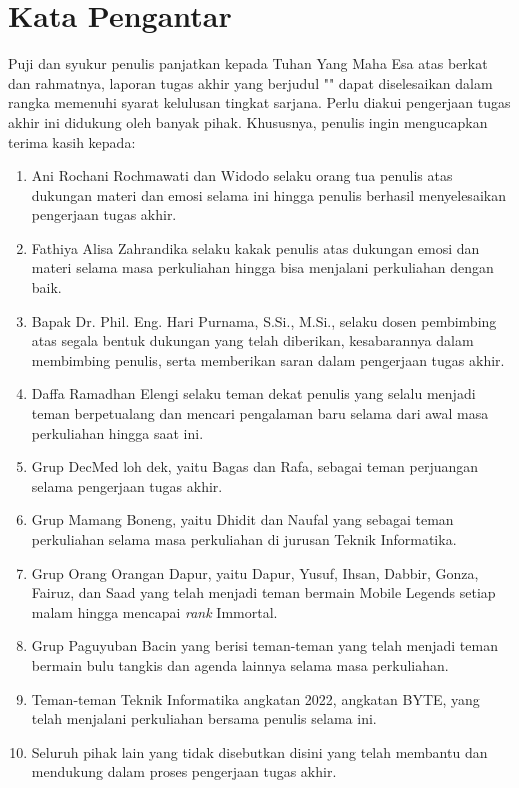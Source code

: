 \documentclass[bahasa, 12pt, a4paper, onecolumn, oneside, final]{report}
\begin{document}
\chapter*{Kata Pengantar}

Puji dan syukur penulis panjatkan kepada Tuhan Yang Maha Esa atas berkat dan rahmatnya, laporan tugas akhir yang berjudul "\thetitle" dapat diselesaikan dalam rangka memenuhi syarat kelulusan tingkat sarjana. Perlu diakui pengerjaan tugas akhir ini didukung oleh banyak pihak. Khususnya, penulis ingin mengucapkan terima kasih kepada:

\begin{enumerate}
	\item Ani Rochani Rochmawati dan Widodo selaku orang tua penulis atas dukungan materi dan emosi selama ini hingga penulis berhasil menyelesaikan pengerjaan tugas akhir.
	\item Fathiya Alisa Zahrandika selaku kakak penulis atas dukungan emosi dan materi selama masa perkuliahan hingga bisa menjalani perkuliahan dengan baik.
	\item Bapak Dr. Phil. Eng. Hari Purnama, S.Si., M.Si., selaku dosen pembimbing atas segala bentuk dukungan yang telah diberikan, kesabarannya dalam membimbing penulis, serta memberikan saran dalam pengerjaan tugas akhir.
	\item Daffa Ramadhan Elengi selaku teman dekat penulis yang selalu menjadi teman berpetualang dan mencari pengalaman baru selama dari awal masa perkuliahan hingga saat ini.
	\item Grup DecMed loh dek, yaitu Bagas dan Rafa, sebagai teman perjuangan selama pengerjaan tugas akhir.
	\item Grup Mamang Boneng, yaitu Dhidit dan Naufal yang sebagai teman perkuliahan selama masa perkuliahan di jurusan Teknik Informatika.
	\item Grup Orang Orangan Dapur, yaitu Dapur, Yusuf, Ihsan, Dabbir, Gonza, Fairuz, dan Saad yang telah menjadi teman bermain Mobile Legends setiap malam hingga mencapai \textit{rank} Immortal.
	\item Grup Paguyuban Bacin yang berisi teman-teman yang telah menjadi teman bermain bulu tangkis dan agenda lainnya selama masa perkuliahan.
	\item Teman-teman Teknik Informatika angkatan 2022, angkatan BYTE, yang telah menjalani perkuliahan bersama penulis selama ini.
	\item Seluruh pihak lain yang tidak disebutkan disini yang telah membantu dan mendukung dalam proses pengerjaan tugas akhir.
\end{enumerate}
\end{document}
